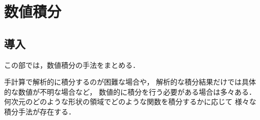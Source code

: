 %

\part{数値積分}

\chapter{導入}

この部では，数値積分の手法をまとめる．

手計算で解析的に積分するのが困難な場合や，
解析的な積分結果だけでは具体的な数値が不明な場合など，
数値的に積分を行う必要がある場合は多々ある．
何次元のどのような形状の領域でどのような関数を積分するかに応じて
様々な積分手法が存在する．




